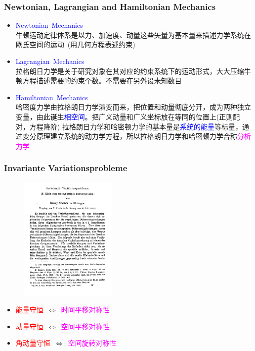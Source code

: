 \frame
{
	\frametitle{\textrm{\small Newtonian, Lagrangian and Hamiltonian Mechanics}}
	\begin{itemize}
   		\setlength{\itemsep}{10pt}
		\item \textrm{\textcolor{blue}{Newtonian~Mechanics}}\\
		牛顿运动定律体系是以力、加速度、动量这些矢量为基本量来描述力学系统在欧氏空间的运动~(用几何方程表述约束)
	\item \textrm{\textcolor{blue}{Lagrangian~Mechanics}}\\
		拉格朗日力学是关于研究对象在其对应的约束系统下的运动形式，大大压缩牛顿方程描述需要的约束个数。不需要在另外设未知数目
	\item \textrm{\textcolor{blue}{Hamiltonian~Mechanics}}\\
		哈密度力学由拉格朗日力学演变而来，把位置和动量彻底分开，成为两种独立变量，由此诞生\textcolor{blue}{相空间}。把广义动量和广义坐标放在等同的位置上(正则配对，方程降阶)
		\vskip 6pt
		拉格朗日力学和哈密顿力学的基本量是\textcolor{blue}{系统的能量}等标量，通过变分原理建立系统的动力学方程，所以拉格朗日力学和哈密顿力学合称\textcolor{magenta}{分析力学}
	\end{itemize}
}

\frame
{
	\frametitle{\textrm{Invariante Variationsprobleme}}
\begin{figure}[h!]
\centering
%
\vspace{-10.5pt}
\includegraphics[height=0.52\textwidth,width=0.42\textwidth,viewport=0 0 450 580,clip]{Figures/Noether_theorem-1st_page.png}
\label{Noether_theorem}
\end{figure}
\begin{itemize}
\centering
	\item \textcolor{red}{能量守恒}~$\Longleftrightarrow$~\textcolor{magenta}{时间平移对称性}
	\item \textcolor{red}{动量守恒}~$\Longleftrightarrow$~\textcolor{magenta}{空间平移对称性}
	\item \textcolor{red}{角动量守恒}~$\Longleftrightarrow$~\textcolor{magenta}{空间旋转对称性}
\end{itemize}
}

